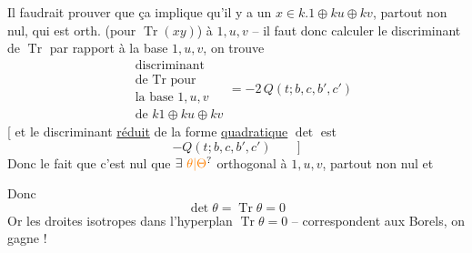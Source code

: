 Il faudrait prouver que ça implique qu'il y a un $x\in k.1\oplus ku\oplus kv$, partout non nul, qui est orth. (pour $\operatorname{Tr}(xy)$) à $1,u,v$ -- il faut donc calculer le  discriminant de $\operatorname{Tr}$ par rapport à la base $1,u,v$, on trouve
\[
\begin{aligned}
&\text{discriminant}\\[-2pt]
&\text{de }\operatorname{Tr}\text{ pour}\\[-2pt]
&\text{la base }1,u,v\\[-2pt]
&\text{de }k1\oplus ku\oplus kv
\end{aligned}
=-2\,Q(t;b,c,b',c')
\]
[ et le discriminant \uline{réduit} de la forme \uline{quadratique} $\det$ est
\[ -Q(t;b,c,b',c')\qquad\biggr] \]
Donc le fait que c'est nul  que  $\exists\ \unsure{\theta|\Theta}$ orthogonal à $1,u,v$, partout non nul et 

Donc 
\[ \det\theta=\operatorname{Tr}\theta=0 \]
Or  les droites isotropes dans l'hyperplan $\operatorname{Tr}\theta=0$ -- correspondent aux Borels,  on gagne !
